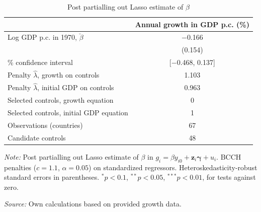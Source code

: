 \begin{table}[!htbp]
\centering
\caption{Post partialling out Lasso estimate of $\beta$}
\label{tab:ppol_estimates}
\begin{threeparttable}
\begin{tabular}{lc}
\toprule
 & Annual growth in GDP p.c. (\%) \\
\midrule
Log GDP p.c. in 1970, $\breve{\beta}$ & $-$0.166 \\
 & (0.154) \\
\addlinespace
95\% confidence interval & [$-$0.468, 0.137] \\
\midrule
Penalty $\hat{\lambda}$, growth on controls & 1.103 \\
Penalty $\hat{\lambda}$, initial GDP on controls & 0.963 \\
Selected controls, growth equation & 0 \\
Selected controls, initial GDP equation & 1 \\
\midrule
Observations (countries) & 67 \\
Candidate controls & 48 \\
\bottomrule
\end{tabular}
\begin{tablenotes}[flushleft]
\footnotesize
\item \textit{Note:} Post partialling out Lasso estimate of $\beta$ in $g_i = \beta y_{i0} + \mathbf{z}_i\boldsymbol{\gamma} + u_i$. BCCH penalties ($c=1.1$, $\alpha=0.05$) on standardized regressors. Heteroskedasticity-robust standard errors in parentheses. $^{*}p<0.1$, $^{**}p<0.05$, $^{***}p<0.01$, for tests against zero.
\item \textit{Source:} Own calculations based on provided growth data.
\end{tablenotes}
\end{threeparttable}
\end{table}